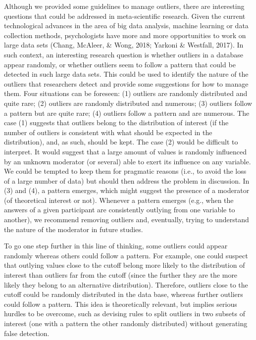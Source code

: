 \documentclass[man,floatsintext]{apa6}
\begin{document}
Although we provided some guidelines to manage outliers, there are interesting questions that could be addressed in meta-scientific research. Given the current technological advances in the area of big data analysis, machine learning or data collection methods, psychologists have more and more opportunities to work on large data sets (Chang, McAleer, \& Wong, 2018; Yarkoni \& Westfall, 2017). In such context, an interesting research question is whether outliers in a database appear randomly, or whether outliers seem to follow a pattern that could be detected in such large data sets. This could be used to identify the nature of the outliers that researchers detect and provide some suggestions for how to manage them. Four situations can be foreseen: (1) outliers are randomly distributed and quite rare; (2) outliers are randomly distributed and numerous; (3) outliers follow a pattern but are quite rare; (4) outliers follow a pattern and are numerous. The case (1) suggests that outliers belong to the distribution of interest (if the number of outliers is consistent with what should be expected in the distribution), and, as such, should be kept. The case (2) would be difficult to interpret. It would suggest that a large amount of values is randomly influenced by an unknown moderator (or several) able to exert its influence on any variable. We could be tempted to keep them for pragmatic reasons (i.e., to avoid the loss of a large number of data) but should then address the problem in discussion. In (3) and (4), a pattern emerges, which might suggest the presence of a moderator (of theoretical interest or not). Whenever a pattern emerges (e.g., when the answers of a given participant are consistently outlying from one variable to another), we recommend removing outliers and, eventually, trying to understand the nature of the moderator in future studies.

To go one step further in this line of thinking, some outliers could appear randomly whereas others could follow a pattern. For example, one could suspect that outlying values close to the cutoff belong more likely to the distribution of interest than outliers far from the cutoff (since the further they are the more likely they belong to an alternative distribution). Therefore, outliers close to the cutoff could be randomly distributed in the data base, whereas further outliers could follow a pattern. This idea is theoretically relevant, but implies serious hurdles to be overcome, such as devising rules to split outliers in two subsets of interest (one with a pattern the other randomly distributed) without generating false detection.
\end{document}
